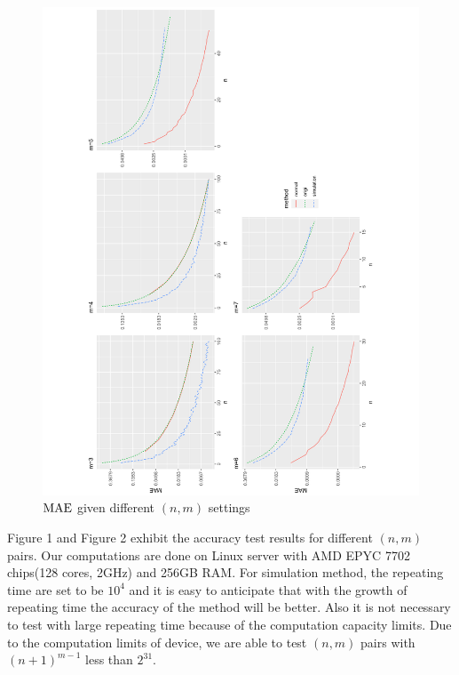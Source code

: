 \documentclass[12pt]{article}
\newcommand{\MAE}{{\rm MAE}}
\begin{document}
\begin{figure}[h]
	\centering
	\includegraphics[angle=-90,origin=c,scale=0.5]{figures/mae_plot.pdf}
	\caption{$\MAE$ given different $(n,m)$ settings}
\end{figure}


Figure 1 and Figure 2 exhibit the accuracy test results for different $(n,m)$ pairs. Our computations are done on Linux server with AMD EPYC 7702 chips(128 cores, 2GHz) and 256GB RAM. For simulation method, the repeating time are set to be $10^4$ and it is easy to anticipate that with the growth of repeating  time the accuracy of the method will be better. Also it is not necessary to test with large repeating time because of the computation capacity limits. Due to the computation limits of device, we are able to test $(n,m)$ pairs with $(n+1)^{m-1}$ less than $2^{31}$. 
\end{document}
